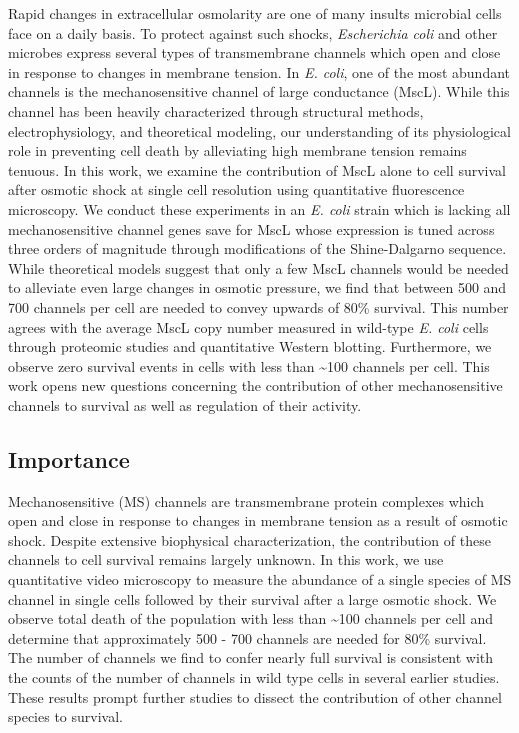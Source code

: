 Rapid
changes
in
extracellular
osmolarity
are
one of
many
insults
microbial
cells
face
on a
daily
basis.
To
protect
against
such
shocks,
\emph{Escherichia
coli}
and
other
microbes
express
several
types
of
transmembrane
channels
which
open
and
close
in
response
to
changes
in
membrane
tension.
In
\emph{E.
coli},
one of
the
most
abundant
channels
is the
mechanosensitive
channel
of
large
conductance
(MscL).
While
this
channel
has
been
heavily
characterized
through
structural
methods,
electrophysiology,
and
theoretical
modeling,
our
understanding
of its
physiological
role
in
preventing
cell
death
by
alleviating
high
membrane
tension
remains
tenuous.
In
this
work,
we
examine
the
contribution
of
MscL
alone
to
cell
survival
after
osmotic
shock
at
single
cell
resolution
using
quantitative
fluorescence
microscopy.
We
conduct
these
experiments
in an
\emph{E.
coli}
strain
which
is
lacking
all
mechanosensitive
channel
genes
save
for
MscL
whose
expression
is
tuned
across
three
orders
of
magnitude
through
modifications
of the
Shine-Dalgarno
sequence.
While
theoretical
models
suggest
that
only a
few
MscL
channels
would
be
needed
to
alleviate
even
large
changes
in
osmotic
pressure,
we
find
that
between
500
and
700
channels
per
cell
are
needed
to
convey
upwards
of
80\%
survival.
This
number
agrees
with
the
average
MscL
copy
number
measured
in
wild-type
\emph{E.
coli}
cells
through
proteomic
studies
and
quantitative
Western
blotting.
Furthermore,
we
observe
zero
survival
events
in
cells
with
less
than
\textasciitilde{}100
channels
per
cell.
This
work
opens
new
questions
concerning
the
contribution
of
other
mechanosensitive
channels
to
survival
as
well
as
regulation
of
their
activity.

\subsection{Importance}\label{importance}

Mechanosensitive
(MS)
channels
are
transmembrane
protein
complexes
which
open
and
close
in
response
to
changes
in
membrane
tension
as a
result
of
osmotic
shock.
Despite
extensive
biophysical
characterization,
the
contribution
of
these
channels
to
cell
survival
remains
largely
unknown.
In
this
work,
we use
quantitative
video
microscopy
to
measure
the
abundance
of a
single
species
of MS
channel
in
single
cells
followed
by
their
survival
after
a
large
osmotic
shock.
We
observe
total
death
of the
population
with
less
than
\textasciitilde{}100
channels
per
cell
and
determine
that
approximately
500 -
700
channels
are
needed
for
80\%
survival.
The
number
of
channels
we
find
to
confer
nearly
full
survival
is
consistent
with
the
counts
of the
number
of
channels
in
wild
type
cells
in
several
earlier
studies.
These
results
prompt
further
studies
to
dissect
the
contribution
of
other
channel
species
to
survival.

